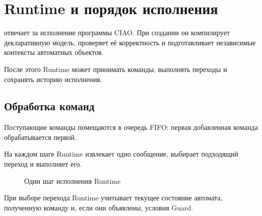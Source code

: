 
\chapter{Runtime и порядок исполнения}
\label{chap:runtime}

 отвечает за исполнение программы CIAO.
При создании он компилирует декларативную модель,
проверяет её корректность и подготавливает независимые
контексты автоматных объектов.

После этого Runtime может принимать команды, выполнять
переходы и сохранять историю исполнения.

\section{Обработка команд}

Поступающие команды помещаются в очередь FIFO:
первая добавленная команда обрабатывается первой.

На каждом шаге Runtime извлекает одно сообщение,
выбирает подходящий переход и выполняет его.

\begin{figure}[ht]
\centering
{}
\caption{Один шаг исполнения Runtime}
\label{fig:runtime-step}
\end{figure}

При выборе перехода Runtime учитывает текущее
состояние автомата, полученную команду и, если они
объявлены, условия Guard.

